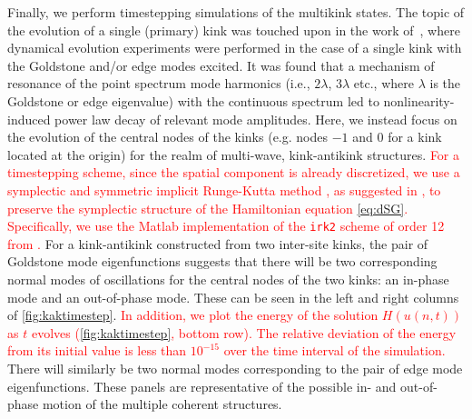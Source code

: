 \documentclass[12pt,reqno]{amsart}
\newcommand{\revised}[1]{ \textcolor{red}{#1} }
\begin{document}
Finally, we perform timestepping simulations of the multikink
states. The topic of the evolution of
a single (primary) kink was touched upon in the work
of~\cite{KevrekidisWeinstein2000}, where dynamical
evolution experiments were performed in the case
of a single kink with the Goldstone and/or edge
modes excited. It was found that a mechanism of
resonance of the point spectrum mode harmonics
(i.e., $2 \lambda$, $3 \lambda$ etc., 
where $\lambda$ is the Goldstone
or edge eigenvalue) with the continuous spectrum
led to nonlinearity-induced power law decay of
relevant mode amplitudes. Here, we instead focus on the evolution
of the central nodes of the kinks (e.g. nodes
$-1$ and $0$ for a kink located at the origin) for the
realm of multi-wave, kink-antikink structures.
\revised{
For a timestepping scheme, since the spatial component is already discretized, we use a symplectic and symmetric implicit Runge-Kutta method \cite{HairerBook}, as suggested in \cite[Section 2.5]{Duncan1997}, to preserve the symplectic structure of the Hamiltonian equation \cref{eq:dSG}. Specifically, we use the Matlab implementation of the \texttt{irk2} scheme of order 12 from \cite{Hairer2003}. 
}
For a kink-antikink constructed from two inter-site kinks, the pair of Goldstone mode eigenfunctions suggests that there will be two corresponding normal modes of oscillations for the central nodes of the two kinks: an in-phase mode and an out-of-phase mode. These can be seen in the left and right columns of \cref{fig:kaktimestep}. \revised{In addition, we plot the energy of the solution $H(u(n, t))$ as $t$ evolves (\cref{fig:kaktimestep}, bottom row). The relative deviation of the energy from its initial value is less than $10^{-15}$ over the time interval of the simulation.}
There will similarly be two normal modes corresponding to the pair of edge mode eigenfunctions.
These panels are representative of the possible in- and out-of-phase motion of the multiple 
coherent structures.
\end{document}
